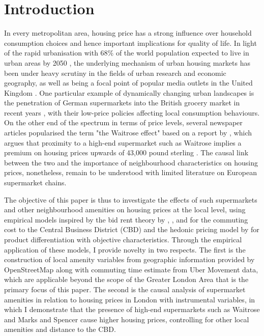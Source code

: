 \documentclass{article}
\begin{document}
\section{Introduction} \label{section:intro}
In every metropolitan area, housing price has a strong influence over household consumption choices and hence important implications for quality of life. In light of the rapid urbanisation with 68\% of the world population expected to live in urban areas by 2050 \citep{UnitedNations201868UN}, the underlying mechanism of urban housing markets has been under heavy scrutiny in the fields of urban research and economic geography, as well as being a focal point of popular media outlets in the United Kingdom \citep{TheGuardian2019HousingMarket}. One particular example of dynamically changing urban landscapes is the penetration of German supermarkets into the British grocery market in recent years \citep{Davey2018AldiMarket}, with their low-price policies affecting local consumption behaviours. On the other end of the spectrum in terms of price levels, several newspaper articles popularised the term "the Waitrose effect" based on a report by \citet{LloydsBank2016LivingHome}, which argues that proximity to a high-end supermarket such as Waitrose implies a premium on housing prices upwards of 43,000 pound sterling \citep{TheIndependent2017WaitrosePounds}. The causal link between the two and the importance of neighbourhood characteristics on housing prices, nonetheless, remain to be understood with limited literature on European supermarket chains.

The objective of this paper is thus to investigate the effects of such supermarkets and other neighbourhood amenities on housing prices at the local level, using empirical models inspired by the bid rent theory by \citet{AlonsoWilliam1964Lalu}, \citet{MuthRichardF.1969Cah:}, and \citet{MillsEdwinSmith1972Sits} for the commuting cost to the Central Business District (CBD) and the hedonic pricing model by \citet{Rosen1984} for product differentiation with objective characteristics. Through the empirical application of these models, I provide novelty in two respects. The first is the construction of local amenity variables from geographic information provided by OpenStreetMap along with commuting time estimate from Uber Movement data, which are applicable beyond the scope of the Greater London Area that is the primary focus of this paper. The second is the causal analysis of supermarket amenities in relation to housing prices in London with instrumental variables, in which I demonstrate that the presence of high-end supermarkets such as Waitrose and Marks and Spencer cause higher housing prices, controlling for other local amenities and distance to the CBD.
\end{document}
